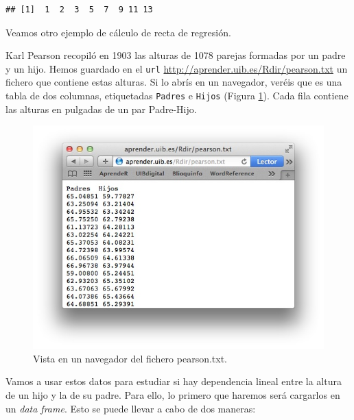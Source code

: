 \documentclass[]{book}
\newenvironment{Shaded}{\begin{snugshade}}{\end{snugshade}}
\newcommand{\NormalTok}[1]{#1}
\newcommand{\OperatorTok}[1]{\textcolor[rgb]{0.81,0.36,0.00}{\textbf{#1}}}
\theoremstyle{definition}
\theoremstyle{definition}
\theoremstyle{definition}
\theoremstyle{remark}
\let\BeginKnitrBlock\begin \let\EndKnitrBlock\end
\begin{document}
\begin{Shaded}
\end{Shaded}

\begin{verbatim}
## [1]  1  2  3  5  7  9 11 13
\end{verbatim}

Veamos otro ejemplo de cálculo de recta de regresión.

\BeginKnitrBlock{example}
\protect\hypertarget{exm:reg2}{}{\label{exm:reg2} }Karl Pearson recopiló en 1903 las alturas de 1078 parejas formadas por un padre y un hijo. Hemos guardado en el \texttt{url} \url{http://aprender.uib.es/Rdir/pearson.txt} un fichero que contiene estas alturas.
Si lo abrís en un navegador, veréis que es una tabla de dos columnas, etiquetadas \texttt{Padres} e \texttt{Hijos} (Figura \ref{fig:pearson}). Cada fila contiene las alturas en pulgadas de un par Padre-Hijo.
\EndKnitrBlock{example}

\begin{figure}

{\centering \includegraphics{AprendeR-Parte-I_files/figure-html/pearson} 

}

\caption{Vista en un navegador del fichero pearson.txt.}\label{fig:pearson}
\end{figure}

Vamos a usar estos datos para estudiar si hay dependencia lineal entre la altura de un hijo y la de su padre. Para ello, lo primero que haremos será cargarlos en un \emph{data frame}. Esto se puede llevar a cabo de dos maneras:
\end{document}
